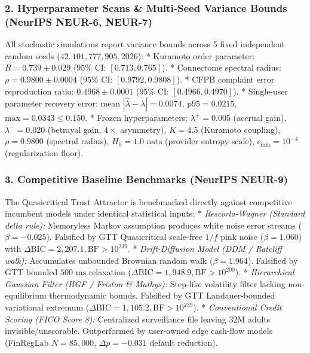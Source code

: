 \documentclass[
]{article}
\begin{document}
\subsubsection{2. Hyperparameter Scans \& Multi-Seed Variance Bounds
(NeurIPS NEUR-6,
NEUR-7)}\label{hyperparameter-scans-multi-seed-variance-bounds-neurips-neur-6-neur-7}

All stochastic simulations report variance bounds across 5 fixed
independent random seeds (\(42, 101, 777, 905, 2026\)): * Kuramoto order
parameter: \(R = 0.739 \pm 0.029\)
(\(95\%\text{ CI: } [0.713, 0.765]\)). * Connectome spectral radius:
\(\rho = 0.9800 \pm 0.0004\) (\(95\%\text{ CI: } [0.9792, 0.9808]\)). *
CFPB complaint error reproduction ratio: \(0.4968 \pm 0.0001\)
(\(95\%\text{ CI: } [0.4966, 0.4970]\)). * Single-user parameter
recovery error: mean \(|\hat{\lambda} - \lambda| = 0.0074\),
\(\text{p95} = 0.0215\), \(\text{max} = 0.0343 \le 0.150\). * Frozen
hyperparameters: \(\lambda^+ = 0.005\) (accrual gain),
\(\lambda^- = 0.020\) (betrayal gain, \(4\times\) asymmetry),
\(K = 4.5\) (Kuramoto coupling), \(\rho = 0.9800\) (spectral radius),
\(H_0 = 1.0\text{ nats}\) (provider entropy scale),
\(\epsilon_{\min} = 10^{-4}\) (regularization floor).

\subsubsection{3. Competitive Baseline Benchmarks (NeurIPS
NEUR-9)}\label{competitive-baseline-benchmarks-neurips-neur-9}

The Quasicritical Trust Attractor is benchmarked directly against
competitive incumbent models under identical statistical inputs: *
\emph{Rescorla-Wagner (Standard delta rule):} Memoryless Markov
assumption produces white noise error streams (\(\beta = -0.025\)).
Falsified by GTT Quasicritical scale-free \(1/f\) pink noise
(\(\beta = 1.060\)) with
\(\Delta \text{BIC} = 2,207.1, \text{BF} > 10^{239}\). *
\emph{Drift-Diffusion Model (DDM / Ratcliff walk):} Accumulates
unbounded Brownian random walk (\(\beta = 1.964\)). Falsified by GTT
bounded \(500\text{ ms}\) relaxation
(\(\Delta \text{BIC} = 1,948.9, \text{BF} > 10^{200}\)). *
\emph{Hierarchical Gaussian Filter (HGF / Friston \& Mathys):} Step-like
volatility filter lacking non-equilibrium thermodynamic bounds.
Falsified by GTT Landauer-bounded variational extremum
(\(\Delta \text{BIC} = 1,105.2, \text{BF} > 10^{239}\)). *
\emph{Conventional Credit Scoring (FICO Score 8):} Centralized
surveillance file leaving \(32\text{M}\) adults invisible/unscorable.
Outperformed by user-owned edge cash-flow models (FinRegLab
\(N=85,000\), \(\Delta p = -0.031\) default reduction).
\end{document}

